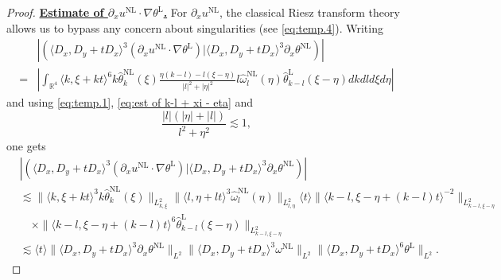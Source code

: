 \documentclass[reqno, 12pt]{amsart} %
\theoremstyle{plain} %
\theoremstyle{definition}
\theoremstyle{remark}
\numberwithin{equation}{section} %
\newcommand{\px}{\partial_x}
\begin{document}
\begin{proof}
		\underline{\bf Estimate of $\px u^{\mathrm{NL}} \cdot \nabla \theta^{\mathrm{L}}$.} For $\px u^{\mathrm{NL}}$, the classical Riesz transform theory allows us to bypass any concern about singularities (see \eqref{eq:temp.4}).
		Writing
		$$
		\begin{aligned}
			& \left|\left(\langle D_x, D_y+t D_x\rangle^3( \px u^{\mathrm{NL}} \cdot \nabla \theta^{\mathrm{L}}) \big| \langle D_x, D_y+t D_x\rangle^3 \px \theta^{\mathrm{NL}}\right)\right| \\
			= & \left|\int_{\mathbb{R}^4}\langle k, \xi+k t\rangle^6 k \hat{\theta}_k^{\mathrm{NL}}(\xi) \frac{\eta(k-l)-l(\xi-\eta)}{|l|^2+|\eta|^2} l\hat{\omega}_l^{\mathrm{NL}}(\eta) \hat{\theta}_{k-l}^{\mathrm{L}}(\xi-\eta) d k d l d \xi d \eta\right|
		\end{aligned}
		$$
		and using \eqref{eq:temp.1}, \eqref{eq:est of k-l + xi - eta} and 
		\begin{equation} \label{eq:temp.4}
			\frac{|l|(|\eta| + |l|)}{l^2   +  \eta^2}  \lesssim 1,
		\end{equation}
		one gets
		\begin{equation}\begin{aligned} \label{eq:4}
				& \left|\left(\langle D_x, D_y+t D_x\rangle^3( \px u^{\mathrm{NL}} \cdot \nabla \theta^{\mathrm{L}}) \big| \langle D_x, D_y+t D_x\rangle^3 \px \theta^{\mathrm{NL}}\right)\right| \\
				& \lesssim\|\langle k, \xi+k t\rangle^3 k\hat{\theta}_k^{\mathrm{NL}}(\xi)\|_{L_{k, \xi}^2}\|\langle l, \eta+l t\rangle^3 \hat{\omega}_l^{\mathrm{NL}}(\eta)\|_{L_{l, \eta}^2}\langle t\rangle\|\langle k-l, \xi-\eta+(k-l) t\rangle^{-2}\|_{L_{k-l, \xi-\eta}^2} \\
				& \quad \times\|\langle k-l, \xi-\eta+(k-l) t\rangle^6 \hat{\theta}_{k-l}^{\mathrm{L}}(\xi-\eta)\|_{L_{k-l, \xi-\eta}^2} \\
				& \lesssim\langle t\rangle   \|\langle D_x, D_y+t D_x\rangle^3 \px \theta^{\mathrm{NL}}\|_{L^2}  \|\langle D_x, D_y+t D_x\rangle^3 \omega^{\mathrm{NL}}\|_{L^2}     \|\langle D_x, D_y+t D_x\rangle^6 \theta^{\mathrm{L}}\|_{L^2}.
		\end{aligned}\end{equation}
		

\end{proof}
\end{document}

